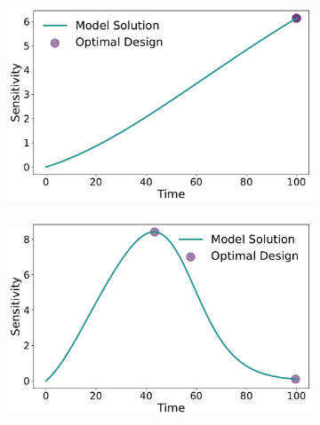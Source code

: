 \documentclass[10pt,A4paper]{article}
\begin{document}
\begin{figure}[H]
\begin{subfigure}{.5\textwidth}
      \includegraphics[scale=0.255]{Figures/Sensitivity_Results_baranyi_roberts_ode_fisher_determinant_rel_sensit_cont_2times_2temps_000_x_00_p_01.pdf}
    \end{subfigure}
    \begin{subfigure}{.5\textwidth}
        \centering
        \includegraphics[scale=0.255]{Figures/Sensitivity_Results_baranyi_roberts_ode_fisher_determinant_rel_sensit_cont_2times_2temps_001_x_00_p_01.pdf}
    \end{subfigure}
    \begin{subfigure}{.5\textwidth}
        \centering

\end{subfigure}
\end{figure}
\end{document}
